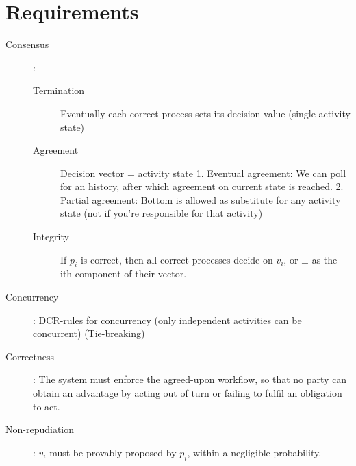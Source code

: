 \documentclass{article}
\begin{document}
	\section*{Requirements}
	\begin{description}
		\item[Consensus]:
			\begin{description}
				\item[Termination] Eventually each correct process sets its decision value (single activity state)
				\item[Agreement] Decision vector = activity state
								1. Eventual agreement: We can poll for an history, after which agreement on current state is reached.
								2. Partial agreement: Bottom is allowed as substitute for any activity state (not if you're responsible for that activity)
				\item[Integrity] If $p_i$ is correct, then all correct processes decide on $v_i$, or $\bot$ as the ith component of their vector.
			\end{description}
		\item[Concurrency]: DCR-rules for concurrency (only independent activities can be concurrent) (Tie-breaking)
		\item[Correctness]: The system must enforce the agreed-upon workflow, so that no party can obtain an advantage by acting out of turn or failing to fulfil an obligation to act.
		\item[Non-repudiation]: $v_i$ must be provably proposed by $p_i$, within a negligible probability.
	\end{description}
\end{document}
